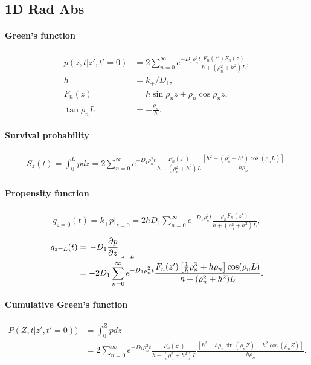 
\subsection{1D Rad Abs}

\renewcommand{\an}{\rho_n}

\paragraph{Green's function}
\begin{align}
  p(z,t|z',t'=0) &= 2\sum_{n=0}^{\infty}
  e^{-D_1\an^2t} \frac
  { F_n(z')F_n(z) }
  {h + (\an^2 + h^2)L}, \\
  h &= k_+ / D_1, \\
  F_n(z) &= h\sin\an z +  \an\cos\an z  , \\
  \tan\an L &= -\frac{\an}{h}.
\end{align}

\paragraph{Survival probability}
\begin{align}
  S_z(t) = \int_0^L pdz
  = 2\sum_{n=0}^{\infty} e^{-D_1\an^2t}
    \frac{F_n(z')}{h + (\an^2 + h^2)L}
    \frac{\left[h^2 - (\an^2 + h^2) \cos(\an L)\right]}{h\an}.
\end{align}

\paragraph{Propensity function}
\begin{align}
  q_{z=0}(t) = k_+ p|_{z=0} =
    2hD_1 \sum_{n=0}^{\infty} e^{-D_1\an^2t}
	  \frac{\an F_n(z')}{h + (\an^2 + h^2)L},
\end{align}
\begin{align}
  q_{z=L}(t) &= \left.- D_1 \pd{p}{z}\right|_{z=L} \\
  &=  -2D_1 \sum_{n=0}^{\infty} e^{-D_1\an^2t}
	    \frac{
	    F_n(z') \left[\frac{1}{h}\an^3 + h\an\right] \cos(\an L)
	    }
	    {h + (\an^2 + h^2)L}.
\end{align}

\paragraph{Cumulative Green's function}
\begin{align}
  P(Z,t|z',t'=0)) &= \int_0^Z pdz	\\
  &= 2\sum_{n=0}^{\infty} e^{-D_1\an^2t}
    \frac{F_n(z')}{h + (\an^2 + h^2)L}
    \frac{\left[h^2 + h\an\sin(\an Z) - h^2 \cos(\an Z)\right]}{h\an}.
\end{align}

